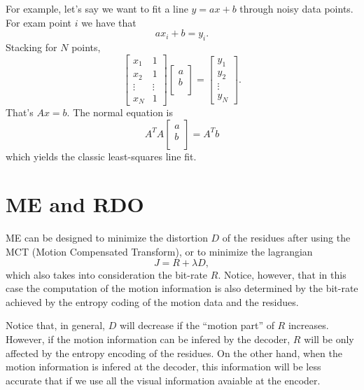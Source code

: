 For example, let's say we want to fit a line $y=ax+b$ through noisy data points. For exam point $i$ we have that
\begin{equation*}
  ax_i+b = y_i.
\end{equation*}
Stacking for $N$ points,
\begin{equation*}
  \begin{bmatrix}
x_1 & 1 \\
x_2 & 1 \\
\vdots & \vdots \\
x_N & 1
\end{bmatrix}
\begin{bmatrix}
a \\
b \\
\end{bmatrix} =
\begin{bmatrix}
y_1 \\
y_2 \\
\vdots \\
y_N
\end{bmatrix}.
\end{equation*}
That's $Ax=b$. The normal equation is
\begin{equation*}
A^TA
\begin{bmatrix}
a \\
b \\
\end{bmatrix} =
A^Tb
\end{equation*}
which yields the classic least-squares line fit.

\section{ME and RDO}

ME can be designed to minimize the distortion $D$ of the residues
after using the MCT (Motion Compensated Transform), or to minimize the
lagrangian
\begin{equation}
  J = R + \lambda D,
\end{equation}
which also takes into consideration the bit-rate $R$. Notice, however,
that in this case the computation of the motion information is also
determined by the bit-rate achieved by the entropy coding of the
motion data and the residues.

Notice that, in general, $D$ will decrease if the ``motion part'' of
$R$ increases. However, if the motion information can be infered by
the decoder, $R$ will be only affected by the entropy encoding of the
residues. On the other hand, when the motion information is infered at
the decoder, this information will be less accurate that if we use all
the visual information avaiable at the encoder.

